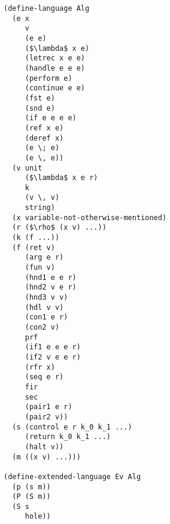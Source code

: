 \documentclass[12pt,a4paper,twoside,openright]{report}
\begin{document}
\begin{lstlisting}[xleftmargin=0cm, xrightmargin=0cm]
(define-language Alg
  (e x
     v
     (e e)
     ($\lambda$ x e)
     (letrec x e e)
     (handle e e e)
     (perform e)
     (continue e e)
     (fst e)
     (snd e)
     (if e e e e)
     (ref x e)
     (deref x)
     (e \; e)
     (e \, e))
  (v unit
     ($\lambda$ x e r)
     k
     (v \, v)
     string)
  (x variable-not-otherwise-mentioned)
  (r ($\rho$ (x v) ...))
  (k (f ...))
  (f (ret v)
     (arg e r)
     (fun v)
     (hnd1 e e r)
     (hnd2 v e r)
     (hnd3 v v)
     (hdl v v)
     (con1 e r)
     (con2 v)
     prf
     (if1 e e e r)
     (if2 v e e r)
     (rfr x)
     (seq e r)
     fir
     sec
     (pair1 e r)
     (pair2 v))
  (s (control e r k_0 k_1 ...)
     (return k_0 k_1 ...)
     (halt v))
  (m ((x v) ...)))

(define-extended-language Ev Alg
  (p (s m))
  (P (S m))
  (S s
     hole))


\end{lstlisting}
\end{document}
